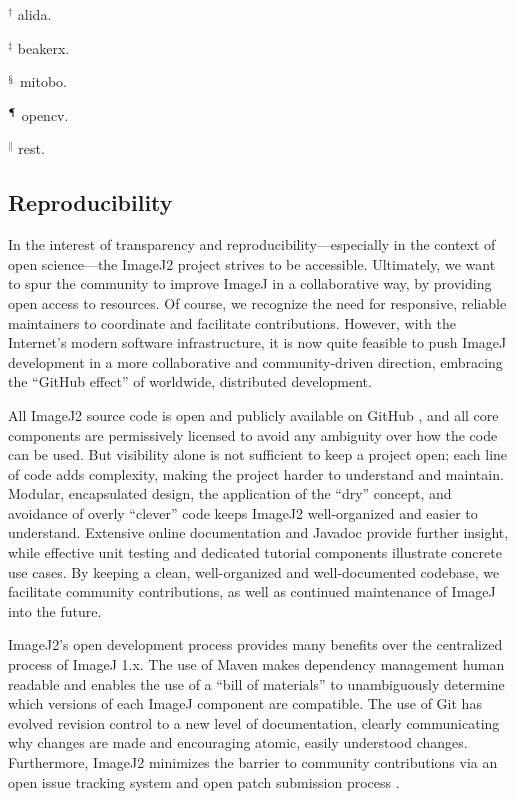 \documentclass{bmcart}
\begin{document}
\begin{table}[h!]
\begin{flushleft}
      $^\dagger$ \acrfull{alida}.

      $^\ddagger$ \acrfull{beakerx}.

      $^\mathsection$ \acrfull{mitobo}.

      $^\mathparagraph$ \acrfull{opencv}.

      $^\|$ \acrfull{rest}.
    \end{flushleft}
  \end{table}

\subsection*{Reproducibility}

In the interest of transparency and reproducibility---especially in the context
of open science---the ImageJ2 project strives to be accessible. Ultimately, we
want to spur the community to improve ImageJ in a collaborative way, by
providing open access to resources. Of course, we recognize the need for
responsive, reliable maintainers to coordinate and facilitate contributions.
However, with the Internet's modern software infrastructure, it is now quite
feasible to push ImageJ development in a more collaborative and
community-driven direction, embracing the ``GitHub effect''
\cite{github_effect} of worldwide, distributed development.

All ImageJ2 source code is open and publicly available on GitHub
\cite{imagej_source_code}, and all core components are permissively licensed
\cite{imagej_licensing} to avoid any ambiguity over how the code can be used.
But visibility alone is not sufficient to keep a project open; each line of
code adds complexity, making the project harder to understand and maintain.
Modular, encapsulated design, the application of the ``\acrfull{dry}'' concept,
and avoidance of overly ``clever'' code keeps ImageJ2 well-organized and easier
to understand. Extensive online documentation \cite{imagej_web_site} and
Javadoc \cite{imagej_javadoc} provide further insight, while effective unit
testing and dedicated tutorial components \cite{imagej_tutorials}
illustrate concrete use cases. By
keeping a clean, well-organized and well-documented codebase, we facilitate
community contributions, as well as continued maintenance of ImageJ into the
future.

ImageJ2's open development process provides many benefits over the centralized
process of ImageJ 1.x. The use of Maven makes dependency management human
readable and enables the use of a ``bill of materials'' to unambiguously
determine which versions of each ImageJ component are compatible. The use of
Git has evolved revision control to a new level of documentation, clearly
communicating why changes are made and encouraging atomic, easily understood
changes. Furthermore, ImageJ2 minimizes the barrier to community contributions
via an open issue tracking system \cite{imagej_issues} and open patch
submission process \cite{imagej_contributing}.
\end{document}
